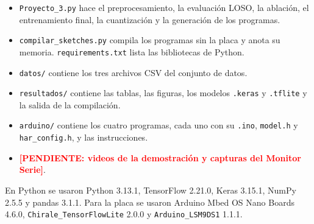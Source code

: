 \documentclass[11pt,a4paper]{article}
\newcommand{\pendiente}[1]{\textcolor{red}{\textbf{[PENDIENTE: #1]}}}
\begin{document}
\begin{itemize}
\item \texttt{Proyecto\_3.py} hace el preprocesamiento, la evaluación LOSO, la ablación, el entrenamiento final, la cuantización y la generación de los programas.
\item \texttt{compilar\_sketches.py} compila los programas sin la placa y anota su memoria. \texttt{requirements.txt} lista las bibliotecas de Python.
\item \texttt{datos/} contiene los tres archivos CSV del conjunto de datos.
\item \texttt{resultados/} contiene las tablas, las figuras, los modelos \texttt{.keras} y \texttt{.tflite} y la salida de la compilación.
\item \texttt{arduino/} contiene los cuatro programas, cada uno con su \texttt{.ino}, \texttt{model.h} y \texttt{har\_config.h}, y las instrucciones.
\item \pendiente{videos de la demostración y capturas del Monitor Serie}.
\end{itemize}

En Python se usaron Python 3.13.1, TensorFlow 2.21.0, Keras 3.15.1, NumPy 2.5.5 y pandas 3.1.1. Para la placa se usaron Arduino Mbed OS Nano Boards 4.6.0, \texttt{Chirale\_TensorFlowLite} 2.0.0 y \texttt{Arduino\_LSM9DS1} 1.1.1.
\end{document}

